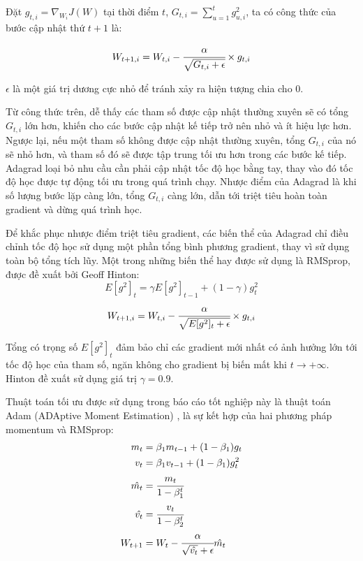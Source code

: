 \documentclass[12pt]{extreport}
\begin{document}
Đặt $ g_{t, i} = \nabla_{W_i} J(W) $ tại thời điểm $ t $, $ G_{t, i} = \sum_{u = 1}^{t} g_{u, i}^2 $, ta có công thức của bước cập nhật thứ $ t + 1 $ là:

$$ W_{t + 1, i} = W_{t, i} - \cfrac{\alpha}{\sqrt{G_{t, i} + \epsilon}} \times g_{t, i}  $$

$ \epsilon $ là một giá trị dương cực nhỏ để tránh xảy ra hiện tượng chia cho 0.

Từ công thức trên, dễ thấy các tham số được cập nhật thường xuyên sẽ có tổng $ G_{t, i} $ lớn hơn, khiến cho các bước cập nhật kế tiếp trở nên nhỏ và ít hiệu lực hơn. Ngược lại, nếu một tham số không được cập nhật thường xuyên, tổng $ G_{t, i} $ của nó sẽ nhỏ hơn, và tham số đó sẽ được tập trung tối ưu hơn trong các bước kế tiếp. Adagrad loại bỏ nhu cầu cần phải cập nhật tốc độ học bằng tay, thay vào đó tốc độ học được tự động tối ưu trong quá trình chạy. Nhược điểm của Adagrad là khi số lượng bước lặp càng lớn, tổng $ G_{t, i} $ càng lớn, dẫn tới triệt tiêu hoàn toàn gradient và dừng quá trình học.

Để khắc phục nhược điểm triệt tiêu gradient, các biến thể của Adagrad chỉ điều chỉnh tốc độ học sử dụng một phần tổng bình phương gradient, thay vì sử dụng toàn bộ tổng tích lũy. Một trong những biến thể hay được sử dụng là RMSprop, được đề xuất bởi Geoff Hinton:
$$ E[g^2]_t = \gamma E[g^2]_{t - 1} + (1 - \gamma) g_t^2 $$
$$ W_{t + 1, i} = W_{t, i} - \cfrac{\alpha}{\sqrt{E[g^2]_t + \epsilon}} \times g_{t, i} $$

Tổng có trọng số $ E[g^2]_t $ đảm bảo chỉ các gradient mới nhất có ảnh hưởng lớn tới tốc độ học của tham số, ngăn không cho gradient bị biến mất khi $ t \to +\infty $. Hinton đề xuất sử dụng giá trị $ \gamma = 0.9 $.

Thuật toán tối ưu được sử dụng trong báo cáo tốt nghiệp này là thuật toán Adam (ADAptive Moment Estimation) \cite{kingma2017adam}, là sự kết hợp của hai phương pháp momentum và RMSprop:
\begin{align*}
    m_t       & = \beta_1m_{t - 1} + (1 - \beta_1) g_t                        \\
    v_t       & = \beta_1v_{t - 1} + (1 - \beta_1) g_t^2                      \\
    \hat{m_t} & = \cfrac{m_t}{1 - \beta_1^t}                                  \\
    \hat{v_t} & = \cfrac{v_t}{1 - \beta_2^t}                                  \\
    W_{t + 1} & = W_t - \cfrac{\alpha}{\sqrt{\hat{v_t}} + \epsilon} \hat{m_t}
\end{align*}
\end{document}

